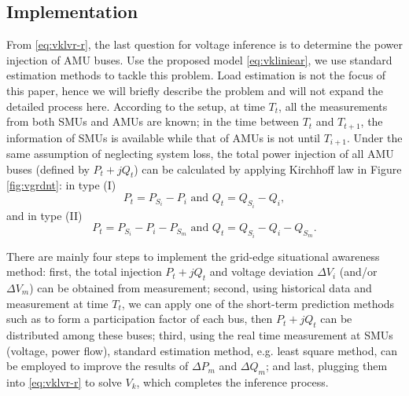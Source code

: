 \documentclass{article}
\begin{document}
\subsection{Implementation}
From \eqref{eq:vklvr-r}, the last question for voltage inference is to determine the power injection of AMU buses. Use the proposed model \eqref{eq:vkliniear}, we use standard estimation methods to tackle this problem. Load estimation is not the focus of this paper, hence we will briefly describe the problem and will not expand the detailed process here.  
According to the setup, at time $T_t$, all the measurements from both SMUs and AMUs are known; in the time between $T_t$ and $T_{t+1}$, the information of SMUs is available while that of AMUs is not until $T_{i+1}$. Under the same assumption of neglecting system loss, the total power injection of all AMU buses (defined by $P_t+jQ_t$) can be calculated by applying Kirchhoff law in Figure \ref{fig:vgrdnt}: in type (I)
\begin{equation}
    P_t=P_{S_i}-P_i\text{ and }Q_t = Q_{S_i}-Q_i,
\end{equation}
and in type (II)
\begin{equation}
    P_t=P_{S_i}-P_i-P_{S_m}\text{ and }Q_t = Q_{S_i}-Q_i-Q_{S_m}.
\end{equation}

There are mainly four steps to implement the grid-edge situational awareness method: first, the total injection $P_t+jQ_t$ and voltage deviation $\Delta V_i$ (and/or $\Delta V_m$) can be obtained from measurement; second, using historical data and measurement at time $T_t$, we can apply one of the short-term prediction methods such as \cite{guan2013hyb,yu2012inte} to form a participation factor of each bus, then $P_t+jQ_t$ can be distributed among these buses; third, using the real time measurement at SMUs (voltage, power flow), standard estimation method, e.g. least square method, can be employed to improve the results of $\Delta P_m$ and $\Delta Q_m$; and last,
plugging them into \eqref{eq:vklvr-r} to solve $V_k$, which completes the inference process.
\end{document}
